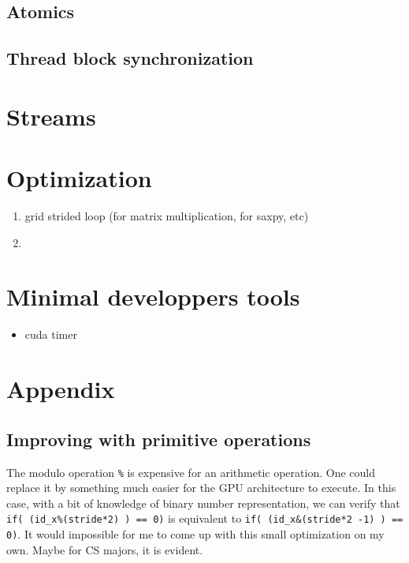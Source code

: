 \documentclass[12pt]{article}
\begin{document}

\subsection{Atomics}








\subsection{Thread block synchronization}

\section{Streams}

\section{Optimization}
\begin{enumerate}
    \item grid strided loop (for matrix multiplication, for saxpy, etc)%
    \item
\end{enumerate}

\section{Minimal developpers tools}
\begin{itemize}
   \item cuda timer
\end{itemize}


\section{Appendix}
\subsection*{Improving with primitive operations}\label{App.:Primitive operations}
The modulo operation \verb|%| is expensive for an arithmetic operation. One could replace it 
by something much easier for the GPU architecture to execute. In this case, with a bit of 
knowledge of binary number representation, we can verify that \verb|if( (id_x%(stride*2) ) == 0)| is 
equivalent to \verb|if( (id_x&(stride*2 -1) ) == 0)|. It would impossible for me to come up with this small 
optimization on my own. Maybe for CS majors, it is evident.
\end{document}

